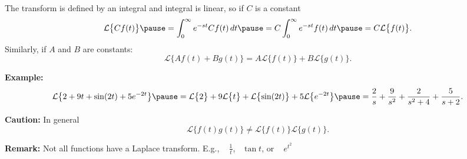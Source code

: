 \documentclass[10pt,aspectratio=169]{beamer}
\begin{document}
\begin{frame}
The transform is defined by an integral and integral is linear, so
if $C$ is a constant
\begin{equation*}
\mathcal{L} \bigl\{ C f(t) \bigr\}
\pause
=
\int_0^\infty e^{-st} C f(t) \,dt
\pause
=
C \int_0^\infty e^{-st} f(t) \,dt
\pause
=
C \mathcal{L} \bigl\{ f(t) \bigr\} .
\end{equation*}
\pause
Similarly, if $A$ and $B$ are constants:
\begin{equation*}
\mathcal{L} \bigl\{ A f(t) + B g(t) \bigr\} =
A \mathcal{L} \bigl\{ f(t) \bigr\} +
B \mathcal{L} \bigl\{ g(t) \bigr\} .
\end{equation*}


\medskip
\pause

\textbf{Example:}
\[
\mathcal{L} \bigl\{
2 + 9t + \sin(2t) + 5 e^{-2t}
\bigr\}
\pause
=
\mathcal{L} \bigl\{
2
\bigr\}
+ 9
\mathcal{L} \bigl\{
t
\bigr\}
+
\mathcal{L} \bigl\{
\sin(2t)
\bigr\}
+ 5
\mathcal{L} \bigl\{
e^{-2t}
\bigr\}
\pause
=
\frac{2}{s}
+
\frac{9}{s^2}
+
\frac{2}{s^2+4}
+
\frac{5}{s+2} .
\]
\pause

\textbf{Caution:}
In general 
\begin{equation*}
\mathcal{L} \bigl\{ f(t) g(t) \bigr\} \not=
\mathcal{L} \bigl\{ f(t) \bigr\}
\mathcal{L} \bigl\{ g(t) \bigr\} .
\end{equation*}

\medskip
\pause

\textbf{Remark:}
Not all functions have a Laplace transform. \quad E.g.,
~
$\frac{1}{t}$, ~$\tan t$, or ~ $e^{t^2}$

\end{frame}
\end{document}
